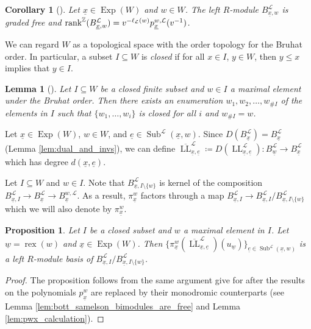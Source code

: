 \documentclass{amsart}
\newcommand{\Z}{\mathbb{Z}}
\newcommand{\scrL}{\mathcal{L}}
\DeclareMathOperator{\rex}{rex}
\DeclareMathOperator{\LL}{LL}
\DeclareMathOperator{\Exp}{Exp}
\DeclareMathOperator{\Subexp}{Sub}
\newcommand{\ue}{\underline{e}}
\newcommand{\uw}{\underline{w}}
\newcommand{\ux}{\underline{x}}
\newcommand{\grk}{\textnormal{rank}^{\Z}}
\newtheorem{corollary}[subsubsection]{Corollary}
\newtheorem{lemma}[subsubsection]{Lemma}
\newtheorem{proposition}[subsubsection]{Proposition}
\theoremstyle{definition}
\numberwithin{equation}{subsection}
\begin{document}
\begin{corollary}[{\cite[Corollary 3.13]{Abe19}}]\label{cor:bott_samelson_graded_free}
    Let $\ux \in \Exp (W)$ and $w \in W$.
    The left $R$-module $B_{\ux, w}^{\scrL}$ is graded free and $\grk (B_{\ux, w}^{\scrL}) = v^{-\ell_{\scrL} (w)} p_{\ux}^{w, \scrL} (v^{-1})$.
\end{corollary}

We can regard $W$ as a topological space with the order topology for the Bruhat order. 
In particular, a subset $I \subseteq W$ is \emph{closed} if for all $x \in I$, $y \in W$, then $y \leq x$ implies that $y \in I$.

\begin{lemma}[{\cite[Lemma 3.16]{Abe19}}]
    Let $I \subseteq W$ be a closed finite subset and $w \in I$ a maximal element under the Bruhat order.
    Then there exists an enumeration $w_1, w_2, \ldots, w_{\# I}$ of the elements in $I$ such that $\{ w_1, \ldots, w_i\}$ is closed for all $i$ and $w_{\# I} = w$. 
\end{lemma}

Let $\ux \in \Exp (W)$, $w \in W$, and $\ue \in \Subexp^{\scrL} (\ux, w)$. Since $D (B_{\ux}^{\scrL}) = B_{\ux}^{\scrL}$ (Lemma \ref{lem:dual_and_invs}), we can define 
$\overline{\LL}_{\ux, \ue}^{\scrL} \coloneq D (\LL_{\ux,\ue}^{\scrL} ) : B_{\uw}^{\scrL} \to B_{\ux}^{\scrL}$ which has degree $d(\ux, \ue)$.

Let $I \subseteq W$ and $w \in I$.
Note that $B_{\ux, I \setminus \{w\}}^{\scrL}$ is kernel of the composition $B_{\ux, I}^{\scrL} \to B_{\ux}^{\scrL} \to B_{\ux}^{w, \scrL}$.
As a result, $\pi_{\ux}^w$ factors through a map $B_{\ux, I}^{\scrL} \to B_{\ux, I}^{\scrL}/B_{\ux, I\setminus\{w\}}^{\scrL}$ which we will also denote by $\pi_{\ux}^w$.


\begin{proposition}\label{prop:intermediate_bases}
    Let $I$ be a closed subset and $w$ a maximal element in $I$.
    Let $\uw = \rex (w)$ and $\ux \in \Exp (W)$.
    Then $\{\pi_{\ux}^w (\overline{\LL}_{\ux, \ue}^{\scrL}) (u_{\uw})\}_{\ue \in \Subexp^{\scrL} (\ux, w)}$ is a left $R$-module basis of $B_{\ux, I}^{\scrL}/B_{\ux,I\setminus\{w\}}^{\scrL}$.
\end{proposition}
\begin{proof}
    The proposition follows from the same argument give for \cite[Theorem 3.17]{Abe19} after the results on the polynomials $p_{\ux}^{w}$ are replaced by their monodromic counterparts (see Lemma \ref{lem:bott_samelson_bimodules_are_free} and Lemma \ref{lem:pwx_calculation}).
\end{proof}
\end{document}
